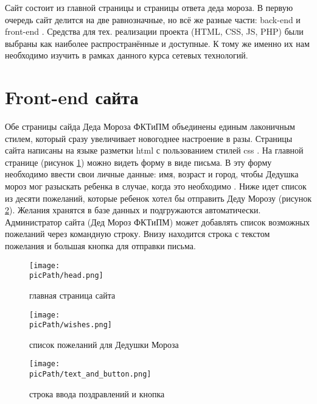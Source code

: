 \documentclass[oneside,final,14pt]{extreport}
\newcommand{\picPath}{pictures}
\begin{document}
Сайт состоит из главной страницы и страницы ответа деда мороза. В первую очередь сайт делится на две равнозначные, но всё же разные части: back-end и front-end \cite{bib:Sinica}. Средства для тех. реализации проекта (HTML, CSS, JS, PHP) были выбраны как наиболее распространённые и доступные. К тому же именно их нам необходимо изучить в рамках данного курса сетевых технологий.

\section{Front-end сайта}

Обе страницы сайда  Деда Мороза ФКТиПМ  объединены единым лаконичным стилем, который сразу увеличивает новогоднее настроение в разы. Страницы сайта написаны на языке разметки html \cite{bib:html}  с пользованием стилей css \cite{bib:css}. На главной странице (рисунок \ref{site:letter}) можно видеть форму в виде письма. В эту форму необходимо ввести свои личные данные: имя, возраст и город, чтобы Дедушка мороз мог разыскать ребенка в случае, когда это необходимо . Ниже идет список из десяти пожеланий, которые ребенок хотел бы отправить Деду Морозу (рисунок \ref{site:wishes}). Желания хранятся в базе данных и подгружаются автоматически. Администратор сайта (Дед Мороз ФКТиПМ) может добавлять список возможных пожеланий через командную строку. Внизу находится строка с текстом пожелания и большая кнопка для отправки письма.
\begin{figure}[H]
  \centering
  \texttt{[image: \\picPath/head.png]}
  \caption{ главная страница сайта }
  \label{site:letter}
\end{figure}

\begin{figure}[H]
	\centering
	\texttt{[image: \\picPath/wishes.png]}
	\caption{ список пожеланий для Дедушки Мороза }
  	\label{site:wishes}
\end{figure}

\begin{figure}[H]
	\centering
	\texttt{[image: \\picPath/text\_and\_button.png]}
	\caption{ строка ввода поздравлений и кнопка }
  	\label{site:button}
\end{figure}

\end{document}
